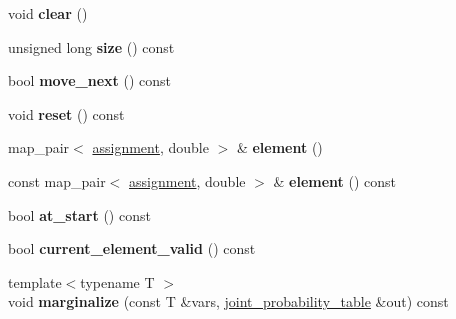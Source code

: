 \begin{DoxyCompactItemize}
\item 
\hypertarget{classdlib_1_1joint__probability__table_a0fdadc3b0d50dfb1750004c5e8eb45a5}{
void {\bfseries clear} ()}
\label{classdlib_1_1joint__probability__table_a0fdadc3b0d50dfb1750004c5e8eb45a5}

\item 
\hypertarget{classdlib_1_1joint__probability__table_a6f89f7c5b1047930740e988a30e70deb}{
unsigned long {\bfseries size} () const }
\label{classdlib_1_1joint__probability__table_a6f89f7c5b1047930740e988a30e70deb}

\item 
\hypertarget{classdlib_1_1joint__probability__table_ae5a43662465634b1eae8c976ffc12684}{
bool {\bfseries move\_\-next} () const }
\label{classdlib_1_1joint__probability__table_ae5a43662465634b1eae8c976ffc12684}

\item 
\hypertarget{classdlib_1_1joint__probability__table_a9767a770bb7e4baf697d7cbf430afa87}{
void {\bfseries reset} () const }
\label{classdlib_1_1joint__probability__table_a9767a770bb7e4baf697d7cbf430afa87}

\item 
\hypertarget{classdlib_1_1joint__probability__table_a0ab414af6311c50e73930d8482dafc87}{
map\_\-pair$<$ \hyperlink{classdlib_1_1assignment}{assignment}, double $>$ \& {\bfseries element} ()}
\label{classdlib_1_1joint__probability__table_a0ab414af6311c50e73930d8482dafc87}

\item 
\hypertarget{classdlib_1_1joint__probability__table_a4fb635d9c175ce8ebc7a4ee7715799dc}{
const map\_\-pair$<$ \hyperlink{classdlib_1_1assignment}{assignment}, double $>$ \& {\bfseries element} () const }
\label{classdlib_1_1joint__probability__table_a4fb635d9c175ce8ebc7a4ee7715799dc}

\item 
\hypertarget{classdlib_1_1joint__probability__table_a431f184917878ad1778e57c9c0ca5ea2}{
bool {\bfseries at\_\-start} () const }
\label{classdlib_1_1joint__probability__table_a431f184917878ad1778e57c9c0ca5ea2}

\item 
\hypertarget{classdlib_1_1joint__probability__table_a7842bab03b20b08947700ac4766544fc}{
bool {\bfseries current\_\-element\_\-valid} () const }
\label{classdlib_1_1joint__probability__table_a7842bab03b20b08947700ac4766544fc}

\item 
\hypertarget{classdlib_1_1joint__probability__table_a1b9d9b5ca2c15171969b7e4fc758f6e6}{
{\footnotesize template$<$typename T $>$ }\\void {\bfseries marginalize} (const T \&vars, \hyperlink{classdlib_1_1joint__probability__table}{joint\_\-probability\_\-table} \&out) const }
\label{classdlib_1_1joint__probability__table_a1b9d9b5ca2c15171969b7e4fc758f6e6}


\end{DoxyCompactItemize}
